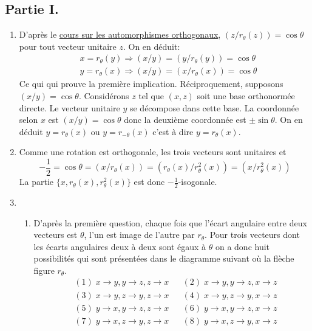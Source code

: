 \subsection*{Partie I.}
\begin{enumerate}
 \item D'après le \href{\coursurl C2263.pdf}{cours sur les automorphismes orthogonaux}, $(z/r_\theta(z))=\cos \theta$ pour tout vecteur unitaire $z$. On en déduit:
\begin{align*}
 &x=r_\theta(y)\Rightarrow (x/y)=(y/r_\theta(y))=\cos \theta\\
 &y=r_\theta(x)\Rightarrow (x/y)=(x/r_\theta(x))=\cos \theta
\end{align*}
Ce qui qui prouve la première implication. Réciproquement, supposons $(x/y)=\cos \theta$. Considérons $z$ tel que $(x,z)$ soit une base orthonormée directe. Le vecteur unitaire $y$ se décompose dans cette base. La coordonnée selon $x$ est $(x/y)=\cos \theta$ donc la deuxième coordonnée est $\pm \sin\theta$. On en déduit $y=r_\theta(x)$ ou $y=r_{-\theta}(x)$ c'est à dire $y=r_\theta(x)$.
 \item Comme une rotation est orthogonale, les trois vecteurs sont unitaires et 
\begin{displaymath}
 -\frac{1}{2}=\cos \theta = (x/r_\theta(x))=(r_\theta(x)/r^2_\theta(x))=(x/r^2_\theta(x))
\end{displaymath}
La partie $\{x,r_\theta(x),r^2_\theta(x)\}$ est donc $-\frac{1}{2}$-isogonale.
 \item 
\begin{enumerate}
 \item D'après la première question, chaque fois que l'écart angulaire entre deux vecteurs est $\theta$, l'un est image de l'autre par $r_\theta$. Pour trois vecteurs dont les écarts angulaires deux à deux sont égaux à $\theta$ on a donc huit possibilités qui sont présentées dans le diagramme suivant où la flèche figure $r_\theta$.
\begin{align*}
 &(1)\; x\rightarrow y , y\rightarrow z , z\rightarrow x &  &(2)\; x\rightarrow y , y\rightarrow z , x\rightarrow z \\
 &(3)\; x\rightarrow y , z\rightarrow y , z\rightarrow x &  &(4)\; x\rightarrow y , z\rightarrow y , x\rightarrow z \\
 &(5)\; y\rightarrow x , y\rightarrow z , z\rightarrow x &  &(6)\; y\rightarrow x , y\rightarrow z , x\rightarrow z \\
 &(7)\; y\rightarrow x , z\rightarrow y , z\rightarrow x &  &(8)\; y\rightarrow x , z\rightarrow y , x\rightarrow z \\

\end{align*}
\end{enumerate}
\end{enumerate}
